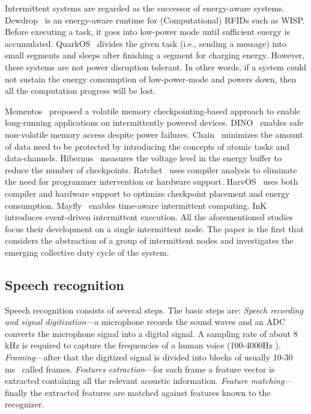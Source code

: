 Intermittent systems are regarded as the successor of energy-aware systems. Dewdrop~\cite{buettner2011dewdrop} is an energy-aware runtime for (Computational) RFIDs such as WISP. Before executing a task, it goes into low-power mode until sufficient energy is accumulated. QuarkOS~\cite{zhang2013quarkos} divides the given task (i.e., sending a message) into small segments and sleeps after finishing a segment for charging energy. However, these systems are not power disruption tolerant. In other words, if a system could not sustain the energy consumption of low-power-mode and powers down, then all the computation progress will be lost. 

Mementos~\cite{mementos} proposed a volatile memory checkpointing-based approach to enable long-running applications on intermittently powered devices. DINO~\cite{dino} enables safe non-volatile memory access despite power failures. Chain~\cite{colin2016chain} minimizes the amount of data need to be protected by introducing the concepts of atomic tasks and data-channels. Hibernus~\cite{balsamo2015hibernus,balsamo2016hibernus++} measures the voltage level in the energy buffer to reduce the number of checkpoints. Ratchet~\cite{woude2016ratchet} uses compiler analysis to eliminate the need for programmer intervention or hardware support. HarvOS~\cite{bhatti2017harvos} uses both compiler and hardware support to optimize checkpoint placement and energy consumption. Mayfly~\cite{hester2017timely} enables time-aware intermittent computing. InK~\cite{yildirim2018ink} introduces event-driven intermittent execution. All the aforementioned studies focus their development on a single intermittent node. The paper is the first that considers the abstraction of a group of intermittent nodes and investigates the emerging collective duty cycle of the system. 

\subsection{Speech recognition}
 Speech recognition consists of several steps. The basic steps are:
\textit{Speech recording and signal digitization}---a microphone records the sound waves and an ADC converts the microphone signal into a digital signal. A sampling rate of about 8 kHz is required to capture the frequencies of a human voice (100-4000Hz \cite{Bernal-Ruiz2005MicrocontrollerSystems}). \textit{Framing}---after that the digitized signal is divided into blocks of usually 10-30 ms~\cite{gaikwad2010review,delaney2002low,delaney2005energy} called frames. \textit{Features extraction}---for each frame a feature vector is extracted containing all the relevant acoustic information. \textit{Feature matching}---finally the extracted features are matched against features known to the recognizer. 

